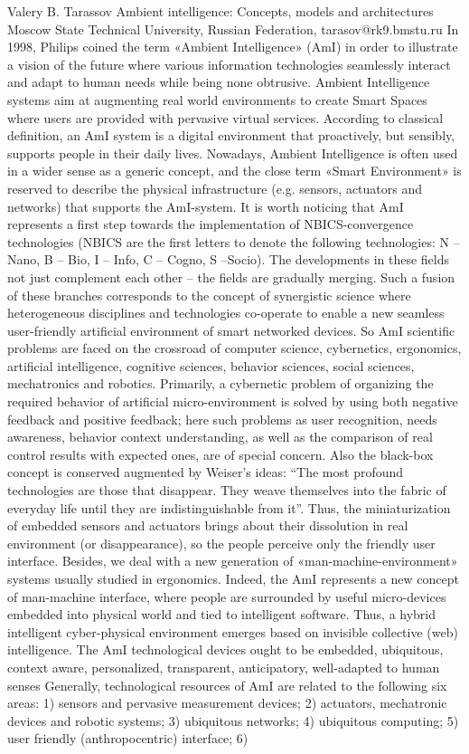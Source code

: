 \documentclass[10pt,fleqn,openany]{book} %
\begin{document}
\begin{enumerate}
	\paperabstract
		{Valery B. Tarassov}
		{Ambient intelligence: Concepts, models and architectures}
		{Moscow State Technical University, Russian Federation, tarasov@rk9.bmstu.ru}
		{
			In 1998, Philips coined the term «Ambient Intelligence» (AmI) in order to illustrate a vision of the future where various information technologies seamlessly interact and adapt to human needs while being none obtrusive. Ambient Intelligence systems aim at augmenting real world environments to create Smart Spaces where users are provided with pervasive virtual services. According to classical definition, an AmI system is a digital environment that proactively, but sensibly, supports people in their daily lives. Nowadays, Ambient Intelligence is often used in a wider sense as a generic concept, and the close term «Smart Environment» is reserved to describe the physical infrastructure (e.g. sensors, actuators and networks) that supports the AmI-system. It is worth noticing that AmI represents a first step towards the implementation of NBICS-convergence technologies (NBICS are the first letters to denote the following technologies: N – Nano, B – Bio, I – Info, C – Cogno, S –Socio). The developments in these fields not just complement each other – the fields are gradually merging. Such a fusion of these branches corresponds to the concept of synergistic science where heterogeneous disciplines and technologies co-operate to enable a new seamless user-friendly artificial environment of smart networked devices. So AmI scientific problems are faced on the crossroad of computer science, cybernetics, ergonomics, artificial intelligence, cognitive sciences, behavior sciences, social sciences, mechatronics and robotics. Primarily, a cybernetic problem of organizing the required behavior of artificial micro-environment is solved by using both negative feedback and positive feedback; here such problems as user recognition, needs awareness, behavior context understanding, as well as the comparison of real control results with expected ones, are of special concern. Also the black-box concept is conserved augmented by Weiser’s ideas: “The most profound technologies are those that disappear. They weave themselves into the fabric of everyday life until they are indistinguishable from it”. Thus, the miniaturization of embedded sensors and actuators brings about their dissolution in real environment (or disappearance), so the people perceive only the friendly user interface. Besides, we deal with a new generation of «man-machine-environment» systems usually studied in ergonomics. Indeed, the AmI represents a new concept of man-machine interface, where people are surrounded by useful micro-devices embedded into physical world and tied to intelligent software. Thus, a hybrid intelligent cyber-physical environment emerges based on invisible collective (web) intelligence. The AmI technological devices ought to be embedded, ubiquitous, context aware, personalized, transparent, anticipatory, well-adapted to human senses Generally, technological resources of AmI are related to the following six areas: 1) sensors and pervasive measurement devices; 2) actuators, mechatronic devices and robotic systems; 3) ubiquitous networks; 4) ubiquitous computing; 5) user friendly (anthropocentric) interface; 6) }
\end{enumerate}
\end{document}

